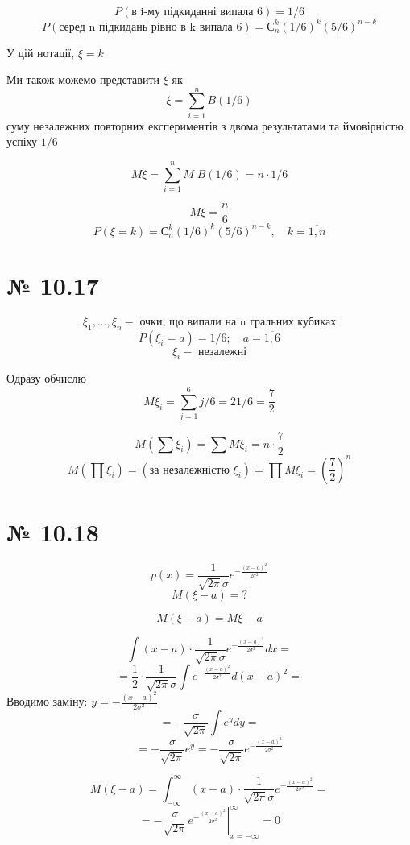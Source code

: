 \documentclass[11pt, a4paper]{article} %
\begin{document}
$$P(\text{в i-му підкиданні випала 6}) = 1/6$$
$$P(\text{серед n підкидань рівно в k випала 6}) = С_n^k (1/6)^k(5/6)^{n-k}$$

У цій нотації, $\xi = k$

Ми також можемо представити $\xi$ як
$$\xi = \sum_{i=1}^n B(1/6)$$
суму незалежних повторних експериментів з двома результатами та ймовірністю успіху $1/6$

$$M\xi = \sum_{i=1}^n M\;B(1/6) = n \cdot 1/6$$

\begin{mdframed}[style=ans]
    $$M\xi = \frac{n}{6}$$
    $$P(\xi = k) = С_n^k (1/6)^k(5/6)^{n-k},\quad k=\overline{1,n}$$
\end{mdframed}



\section*{№ 10.17}
$$\xi_1, ..., \xi_n - \text{ очки, що випали на n гральних кубиках}$$
$$P(\xi_i = a) = 1/6;\quad a=\overline{1,6}$$
$$\xi_i - \text{ незалежні}$$

Одразу обчислю
$$M\xi_i = \sum_{j=1}^6 j/6 = 21/6 = \frac{7}{2}$$

\begin{mdframed}[style=ans]
    $$M(\sum \xi_i) = \sum M\xi_i = n\cdot \frac{7}{2}$$
    $$M(\prod \xi_i) = \left(\text{за незалежністю }\xi_i\right) = \prod M\xi_i = \left(\frac{7}{2}\right)^n$$
\end{mdframed}

\section*{№ 10.18}
\begin{mdframed}
    $$p(x) = \frac{1}{\sqrt{2\pi}\sigma}e^{-\frac{(x-a)^2}{2\sigma^2}}$$
    $$M(\xi-a) = ?$$
\end{mdframed}

$$M(\xi-a) = M\xi - a$$

$$ \int (x-a)\cdot \frac{1}{\sqrt{2\pi}\sigma}e^{-\frac{(x-a)^2}{2\sigma^2}} dx = $$
$$= \frac{1}{2}\cdot \frac{1}{\sqrt{2\pi}\sigma} \int e^{-\frac{(x-a)^2}{2\sigma^2}} d(x-a)^2 = $$
Вводимо заміну: $y = -\frac{(x-a)^2}{2\sigma^2}$
$$= -\frac{\sigma}{\sqrt{2\pi}} \int e^{y} dy = $$
$$= -\frac{\sigma}{\sqrt{2\pi}} e^y = -\frac{\sigma}{\sqrt{2\pi}} e^{-\frac{(x-a)^2}{2\sigma^2}}$$

$$M(\xi-a) = \int_{-\infty}^\infty (x-a)\cdot \frac{1}{\sqrt{2\pi}\sigma}e^{-\frac{(x-a)^2}{2\sigma^2}} = $$
$$=\left. -\frac{\sigma}{\sqrt{2\pi}} e^{-\frac{(x-a)^2}{2\sigma^2}}\right|_{x=-\infty}^{\infty} = 0$$
\end{document}
